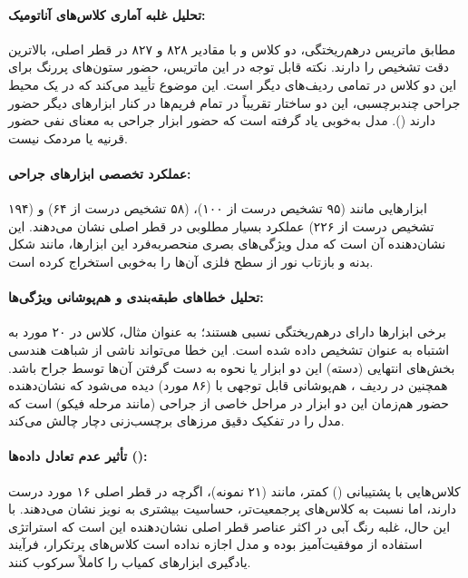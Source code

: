 \documentclass{article}
\begin{document}
\paragraph{تحلیل غلبه آماری کلاس‌های آناتومیک:} 
مطابق ماتریس درهم‌ریختگی، دو کلاس  و  با مقادیر ۸۲۸ و ۸۲۷ در قطر اصلی، بالاترین دقت تشخیص را دارند. نکته قابل توجه در این ماتریس، حضور ستون‌های پررنگ برای این دو کلاس در تمامی ردیف‌های دیگر است. این موضوع تأیید می‌کند که در یک محیط جراحی چندبرچسبی، این دو ساختار تقریباً در تمام فریم‌ها در کنار ابزارهای دیگر حضور دارند (). مدل به‌خوبی یاد گرفته است که حضور ابزار جراحی به معنای نفی حضور قرنیه یا مردمک نیست.

\paragraph{عملکرد تخصصی ابزارهای جراحی:} 
ابزارهایی مانند  (۹۵ تشخیص درست از ۱۰۰)،  (۵۸ تشخیص درست از ۶۴) و  (۱۹۴ تشخیص درست از ۲۲۶) عملکرد بسیار مطلوبی در قطر اصلی نشان می‌دهند. این نشان‌دهنده آن است که مدل  ویژگی‌های بصری منحصربه‌فرد این ابزارها، مانند شکل بدنه و بازتاب نور از سطح فلزی آن‌ها را به‌خوبی استخراج کرده است.

\paragraph{تحلیل خطاهای طبقه‌بندی و هم‌پوشانی ویژگی‌ها:} 
برخی ابزارها دارای درهم‌ریختگی نسبی هستند؛ به عنوان مثال، کلاس  در ۲۰ مورد به اشتباه به عنوان  تشخیص داده شده است. این خطا می‌تواند ناشی از شباهت هندسی بخش‌های انتهایی (دسته) این دو ابزار یا نحوه به دست گرفتن آن‌ها توسط جراح باشد. همچنین در ردیف ، هم‌پوشانی قابل توجهی با  (۸۶ مورد) دیده می‌شود که نشان‌دهنده حضور هم‌زمان این دو ابزار در مراحل خاصی از جراحی (مانند مرحله فیکو) است که مدل را در تفکیک دقیق مرزهای برچسب‌زنی دچار چالش می‌کند.

\paragraph{تأثیر عدم تعادل داده‌ها ():} 
کلاس‌هایی با پشتیبانی () کمتر، مانند  (۲۱ نمونه)، اگرچه در قطر اصلی ۱۶ مورد درست دارند، اما نسبت به کلاس‌های پرجمعیت‌تر، حساسیت بیشتری به نویز نشان می‌دهند. با این حال، غلبه رنگ آبی در اکثر عناصر قطر اصلی نشان‌دهنده این است که استراتژی استفاده از  موفقیت‌آمیز بوده و مدل اجازه نداده است کلاس‌های پرتکرار، فرآیند یادگیری ابزارهای کمیاب را کاملاً سرکوب کنند.
\end{document}
